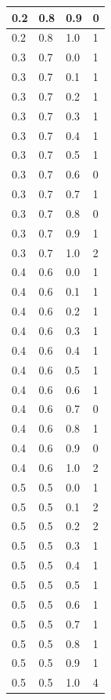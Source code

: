 \documentclass{bmstu}[a4paper]
\begin{document}
\begin{longtable}{|p{}|p{}|p{}|p{}|}
	0.2 &  0.8 &  0.9 &     0 \\\hline
	0.2 &  0.8 &  1.0 &     1 \\\hline
	0.3 &  0.7 &  0.0 &     1 \\\hline
	0.3 &  0.7 &  0.1 &     1 \\\hline
	0.3 &  0.7 &  0.2 &     1 \\\hline
	0.3 &  0.7 &  0.3 &     1 \\\hline
	0.3 &  0.7 &  0.4 &     1 \\\hline
	0.3 &  0.7 &  0.5 &     1 \\\hline
	0.3 &  0.7 &  0.6 &     0 \\\hline
	0.3 &  0.7 &  0.7 &     1 \\\hline
	0.3 &  0.7 &  0.8 &     0 \\\hline
	0.3 &  0.7 &  0.9 &     1 \\\hline
	0.3 &  0.7 &  1.0 &     2 \\\hline
	0.4 &  0.6 &  0.0 &     1 \\\hline
	0.4 &  0.6 &  0.1 &     1 \\\hline
	0.4 &  0.6 &  0.2 &     1 \\\hline
	0.4 &  0.6 &  0.3 &     1 \\\hline
	0.4 &  0.6 &  0.4 &     1 \\\hline
	0.4 &  0.6 &  0.5 &     1 \\\hline
	0.4 &  0.6 &  0.6 &     1 \\\hline
	0.4 &  0.6 &  0.7 &     0 \\\hline
	0.4 &  0.6 &  0.8 &     1 \\\hline
	0.4 &  0.6 &  0.9 &     0 \\\hline
	0.4 &  0.6 &  1.0 &     2 \\\hline
	0.5 &  0.5 &  0.0 &     1 \\\hline
	0.5 &  0.5 &  0.1 &     2 \\\hline
	0.5 &  0.5 &  0.2 &     2 \\\hline
	0.5 &  0.5 &  0.3 &     1 \\\hline
	0.5 &  0.5 &  0.4 &     1 \\\hline
	0.5 &  0.5 &  0.5 &     1 \\\hline
	0.5 &  0.5 &  0.6 &     1 \\\hline
	0.5 &  0.5 &  0.7 &     1 \\\hline
	0.5 &  0.5 &  0.8 &     1 \\\hline
	0.5 &  0.5 &  0.9 &     1 \\\hline
	0.5 &  0.5 &  1.0 &     4 \\\hline

\end{longtable}
\end{document}
